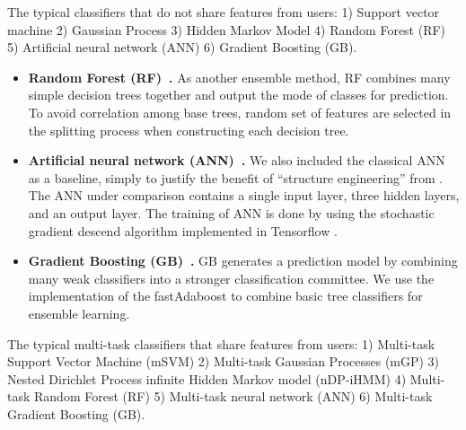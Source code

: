 The typical classifiers that do not share features from users:  1) Support vector machine 2) Gaussian Process 3) Hidden Markov Model 4) Random Forest (RF) 5) Artificial neural network (ANN) 6) Gradient Boosting (GB).

\begin{itemize}
  \item
  \textbf{Random Forest (RF)~\cite{bib:liaw2002classification}.}
  As another ensemble method, RF combines many simple decision trees together and output the mode of classes for prediction.
  To avoid correlation among base trees, random set of features are selected in the splitting process when constructing each decision tree.

  \item
  \textbf{Artificial neural network (ANN)~\cite{bib:wang2003artificial}.}
  We also included the classical ANN as a baseline, simply to justify the benefit of ``structure engineering'' from \modelname. The ANN under comparison contains a single input layer, three hidden layers, and an output layer. The training of ANN is done by using the stochastic gradient descend algorithm implemented in Tensorflow \cite{bib:Tensorflow}.

  \item
  \textbf{Gradient Boosting (GB)~\cite{bib:friedman2002stochastic}.}
  GB generates a prediction model by combining many weak classifiers into a stronger classification committee.
  We use the implementation of the fastAdaboost \cite{bib:fastAdaboost} to combine basic tree classifiers for ensemble learning.
\end{itemize}

 The typical multi-task classifiers that share features from users:  1) Multi-task Support Vector Machine (mSVM) 2) Multi-task Gaussian Processes (mGP) 3) Nested Dirichlet Process infinite Hidden Markov model (nDP-iHMM) 4) Multi-task Random Forest (RF) 5) Multi-task neural network (ANN) 6) Multi-task Gradient Boosting (GB).



